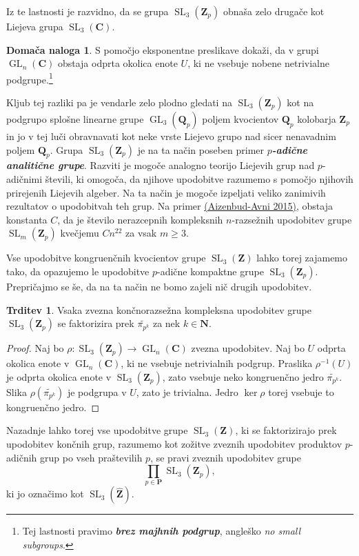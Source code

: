 \documentclass[11pt]{book}
\def\NN{\mathbf{N}}
\def\ZZ{\mathbf{Z}}
\def\QQ{\mathbf{Q}}
\def\CC{\mathbf{C}}
\def\PP{\mathbf{P}}
\DeclareMathOperator\GL{GL}
\DeclareMathOperator\SL{SL}
\def\definicija{\color{rdeca}\bf\em}
\theoremstyle{definition}
\theoremstyle{zgled}
\theoremstyle{odprtproblem}
\theoremstyle{domacanaloga}
\newtheorem*{domacanaloga}{Domača naloga}
\newenvironment{dokaz}
    {\color{siva}\begin{proof}}
    {\end{proof}}
\theoremstyle{izrek}
\newtheorem*{trditev}{Trditev}
\begin{document}
Iz te lastnosti je razvidno, da se grupa $\SL_3(\ZZ_p)$ obnaša zelo drugače kot Liejeva grupa $\SL_3(\CC)$.

\begin{domacanaloga}
S pomočjo eksponentne preslikave dokaži, da v grupi $\GL_n(\CC)$ obstaja odprta okolica enote $U$, ki ne vsebuje nobene netrivialne podgrupe.\footnote{Tej lastnosti pravimo {\definicija brez majhnih podgrup}, angleško \emph{no small subgroups}.}
\end{domacanaloga}

Kljub tej razliki pa je vendarle zelo plodno gledati na $\SL_3(\ZZ_p)$ kot na podgrupo splošne linearne grupe $\GL_3(\QQ_p)$ poljem kvocientov $\QQ_p$ kolobarja $\ZZ_p$ in jo v tej luči obravnavati kot neke vrste Liejevo grupo nad sicer nenavadnim poljem $\QQ_p$. Grupa $\SL_3(\ZZ_p)$ je na ta način poseben primer {\definicija $p$-adične analitične grupe}. Razviti je mogoče analogno teorijo Liejevih grup nad $p$-adičnimi števili, ki omogoča, da njihove upodobitve razumemo s pomočjo njihovih prirejenih Liejevih algeber. Na ta način je mogoče izpeljati veliko zanimivih rezultatov o upodobitvah teh grup. Na primer \href{https://link.springer.com/article/10.1007/s00222-015-0614-8}{(Aizenbud-Avni 2015)}, obstaja konstanta $C$, da je število nerazcepnih kompleksnih $n$-razsežnih upodobitev grupe $\SL_m(\ZZ_p)$ kvečjemu $C n^{22}$ za vsak $m \geq 3$.

Vse upodobitve kongruenčnih kvocientov grupe $\SL_3(\ZZ)$ lahko torej zajamemo tako, da opazujemo le upodobitve $p$-adične kompaktne grupe $\SL_3(\ZZ_p)$. Prepričajmo se še, da na ta način ne bomo zajeli nič drugih upodobitev.

\begin{trditev}
Vsaka zvezna končnorazsežna kompleksna upodobitev grupe $\SL_3(\ZZ_p)$ se faktorizira prek $\widetilde{\pi_{p^k}}$ za nek $k \in \NN$.
\end{trditev}
\begin{dokaz}
Naj bo $\rho \colon \SL_3(\ZZ_p) \to \GL_n(\CC)$ zvezna upodobitev. Naj bo $U$ odprta okolica enote v $\GL_n(\CC)$, ki ne vsebuje netrivialnih podgrup. Praslika $\rho^{-1}(U)$ je odprta okolica enote v $\SL_3(\ZZ_p)$, zato vsebuje neko kongruenčno jedro $\widetilde{\pi_{p^k}}$. Slika $\rho(\widetilde{\pi_{p^k}})$ je podgrupa v $U$, zato je trivialna. Jedro $\ker \rho$ torej vsebuje to kongruenčno jedro.
\end{dokaz}

Nazadnje lahko torej vse upodobitve grupe $\SL_3(\ZZ)$, ki se faktorizirajo prek upodobitev končnih grup, razumemo kot zožitve zveznih upodobitev produktov $p$-adičnih grup po vseh praštevilih $p$, se pravi zveznih upodobitev grupe
\[
    \prod_{p \in \PP} {\textstyle \SL_3(\ZZ_p)},
\]
ki jo označimo kot $\SL_3(\widehat{\ZZ})$.
\end{document}
